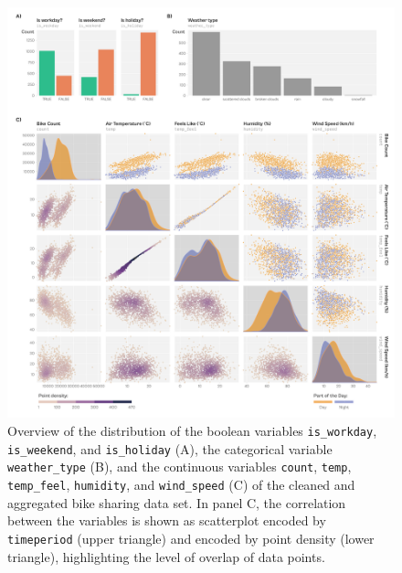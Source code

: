 \documentclass[
]{krantz}
\begin{document}
\begin{figure}
\centering
\includegraphics{./img/setup-data-comparison-all-dodge.png}
\caption{\label{fig:img-data-overview-vars}Overview of the distribution of the boolean variables \texttt{is\_workday}, \texttt{is\_weekend}, and \texttt{is\_holiday} (A), the categorical variable \texttt{weather\_type} (B), and the continuous variables \texttt{count}, \texttt{temp}, \texttt{temp\_feel}, \texttt{humidity}, and \texttt{wind\_speed} (C) of the cleaned and aggregated bike sharing data set. In panel C, the correlation between the variables is shown as scatterplot encoded by \texttt{timeperiod} (upper triangle) and encoded by point density (lower triangle), highlighting the level of overlap of data points.}
\end{figure}

\begingroup\fontsize{13}{15}\selectfont
\end{document}
